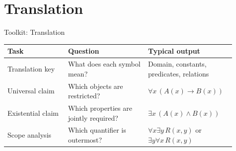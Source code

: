 \section{Translation}

\begin{toolkitbox}{Toolkit: Translation}
\small
\begin{tabular}{p{0.25\linewidth} p{0.33\linewidth} p{0.33\linewidth}}
\toprule
\textbf{Task} & \textbf{Question} & \textbf{Typical output} \\
\midrule
Translation key & What does each symbol mean? & Domain, constants, predicates, relations \\
Universal claim & Which objects are restricted? & \(\forall x\,(A(x)\to B(x))\) \\
Existential claim & Which properties are jointly required? & \(\exists x\,(A(x)\land B(x))\) \\
Scope analysis & Which quantifier is outermost? & \(\forall x\exists y\,R(x,y)\) or \(\exists y\forall x\,R(x,y)\) \\
\bottomrule
\end{tabular}
\end{toolkitbox}





